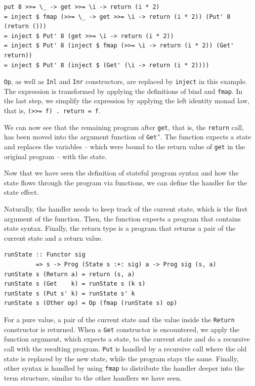 \documentclass[a4paper, 11pt, fleqn, twoside, abstract=on]{scrreprt}
\newcommand{\hinl}[1]{\texttt{#1}}
\begin{document}
\begin{verbatim}
put 8 >>= \_ -> get >>= \i -> return (i * 2)
= inject $ fmap (>>= \_ -> get >>= \i -> return (i * 2)) (Put' 8 (return ()))
= inject $ Put' 8 (get >>= \i -> return (i * 2))
= inject $ Put' 8 (inject $ fmap (>>= \i -> return (i * 2)) (Get' return))
= inject $ Put' 8 (inject $ (Get' (\i -> return (i * 2))))
\end{verbatim}
\noindent
\hinl{Op}, as well as \hinl{Inl} and \hinl{Inr} constructors, are replaced by \hinl{inject} in this example.
The expression is transformed by applying the definitions of bind and \hinl{fmap}.
In the last step, we simplify the expression by applying the left identity monad law, that is, \hinl{(>>= f) . return = f}.

We can now see that the remaining program after \hinl{get}, that is, the \hinl{return} call, has been moved into the argument function of \hinl{Get'}.
The function expects a state and replaces the variables -- which were bound to the return value of \hinl{get} in the original program -- with the state.

Now that we have seen the definition of stateful program syntax and how the state flows through the program via functions, we can define the handler for the state effect.

Naturally, the handler needs to keep track of the current state, which is the first argument of the function.
Then, the function expects a program that contains state syntax.
Finally, the return type is a program that returns a pair of the current state and a return value.

\begin{verbatim}
runState :: Functor sig 
         => s -> Prog (State s :+: sig) a -> Prog sig (s, a)
runState s (Return a) = return (s, a)
runState s (Get    k) = runState s (k s)
runState s (Put s' k) = runState s' k
runState s (Other op) = Op (fmap (runState s) op)
\end{verbatim}
\noindent
For a pure value, a pair of the current state and the value inside the \hinl{Return} constructor is returned.
When a \hinl{Get} constructor is encountered, we apply the function argument, which expects a state, to the current state and do a recursive call with the resulting program.
\hinl{Put} is handled by a recursive call where the old state is replaced by the new state, while the program stays the same.
Finally, other syntax is handled by using \hinl{fmap} to distribute the handler deeper into the term structure, similar to the other handlers we have seen.
\end{document}
